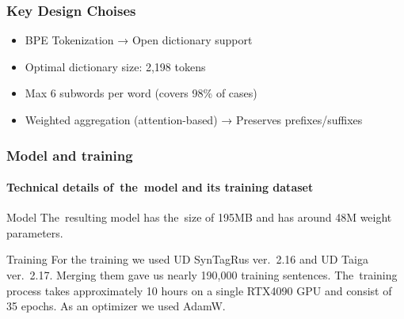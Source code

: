 \documentclass{beamer}
\begin{document}
\begin{frame}
\frametitle{Key Design Choises}
\begin{itemize}
\item BPE Tokenization → Open dictionary support
\item Optimal dictionary size: 2,198 tokens
\item Max 6 subwords per word (covers 98\% of cases)
\item Weighted aggregation (attention-based) → Preserves prefixes/suffixes
\end{itemize}
\end{frame}


\begin{frame}
\frametitle{Model and training}
\framesubtitle{  Technical details of~the~model and its training dataset}
\begin{block}{Model}
The~resulting model has the~size of 195MB and has around 48M weight parameters.
\end{block}
\begin{block}{Training}
For the training we used UD SynTagRus ver.~2.16 and UD Taiga ver.~2.17.
Merging them gave us nearly 190,000 training sentences.
The~training process takes approximately 10 hours on a single RTX4090 GPU and consist of 35 epochs.
As an optimizer we used AdamW.
\end{block}
\end{frame}
\end{document}
